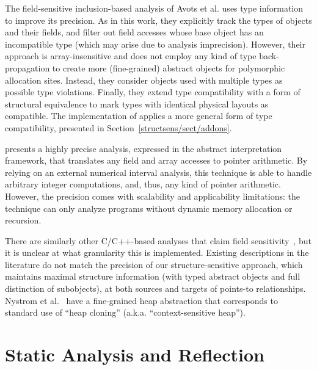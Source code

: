 The field-sensitive inclusion-based analysis of Avots et
al. \cite{icse/AvotsDLL05} uses type information to improve its
precision. As in this work, they explicitly track the types of objects
and their fields, and filter out field accesses whose base object has
an incompatible type (which may arise due to analysis
imprecision). However, their approach is array-insensitive and does
not employ any kind of type back-propagation to create more
(fine-grained) abstract objects for polymorphic allocation
sites. Instead, they consider objects used with multiple types as
possible type violations. Finally, they extend type compatibility with
a form of structural equivalence to mark types with identical physical
layouts as compatible. The implementation of \cclyzer{} applies a more
general form of type compatibility, presented in
Section~\ref{structsens/sect/addons}.

\citeauthor{lctrts/Mine06} \cite{lctrts/Mine06} presents a highly
precise analysis, expressed in the abstract interpretation framework,
that translates any field and array accesses to pointer arithmetic. By
relying on an external numerical interval analysis, this technique is
able to handle arbitrary integer computations, and, thus, any kind of
pointer arithmetic. However, the precision comes with scalability and
applicability limitations: the technique can only analyze programs
without dynamic memory allocation or recursion.

There are similarly other C/C++-based analyses that claim
field sensitivity~\cite{popl/HardekopfL09,cgo/HardekopfL11}, but it is
unclear at what granularity this is implemented. Existing descriptions
in the literature do not match the precision of our
structure-sensitive approach, which maintains maximal structure
information (with typed abstract objects and full distinction of subobjects), at
both sources and targets of points-to relationships. Nystrom et
al.~\cite{paste/NystromKH04} have a fine-grained heap abstraction that
corresponds to standard use of ``heap cloning''
(a.k.a. ``context-sensitive heap'').%


\section{Static Analysis and Reflection}
\label{related:sect/reflection}

